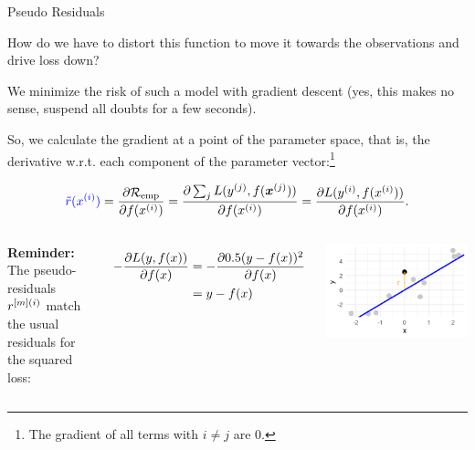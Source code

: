 \begin{vbframe}{Pseudo Residuals}
\begin{footnotesize}
How do we have to distort this function to move it towards the observations and drive loss down?

\vspace*{0.2cm}
We minimize the risk of such a model with gradient descent (yes, this makes no sense,
suspend all doubts for a few seconds).

So, we calculate the gradient at a point of the parameter space, that is, the derivative w.r.t. each component of the parameter vector:\footnote{The gradient of all terms with $i \neq j$ are 0.}

$$
  \textcolor{blue}{\tilde{r}(x^{(i)})} = \frac{\partial \mathcal{R}_{\text{emp}}}{\partial f(x^{(i)})} = \frac{\partial \sum_j L(y^{(j)}, f(\bm{x}^{(j)}))}{\partial f(x^{(i)})} = \frac{\partial L(y^{(i)}, f(x^{(i)}))}{\partial f(x^{(i)})}.
$$

\vspace*{0.5cm}


\begin{columns}
\column{5cm}
\textbf{Reminder:} The pseudo-residuals $r^{[m](i)}$ match the usual residuals for the squared loss:


\begin{align*}
- \frac{\partial L(y, f(x))}{\partial f(x)} & = - \frac{\partial 0.5(y - f(x))^2}{\partial f(x)}\\ 
                 & = y - f(x)
\end{align*}

\column{5cm}
\begin{center}
  \includegraphics[width=1\textwidth]{figure/pseudo_residual_1.png}
\end{center}

\end{columns}

\end{footnotesize}


\end{vbframe}

